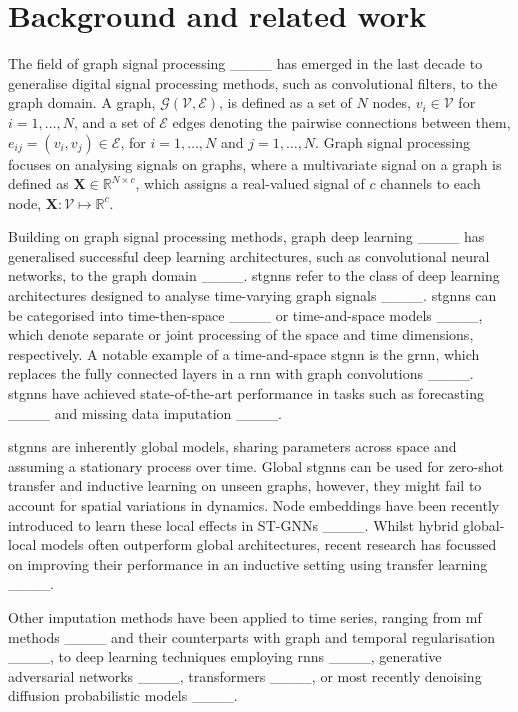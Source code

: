 \section{Background and related work}
\label{sec:background}
The field of graph signal processing ____ has emerged in the last decade to generalise digital signal processing methods, such as convolutional filters, to the graph domain. A graph, $\mathcal{G}(\mathcal{V}, \mathcal{E})$, is defined as a set of $N$ nodes, $v_i \in \mathcal{V}$ for $i = 1, \ldots, N$, and a set of $\mathcal{E}$ edges denoting the pairwise connections between them, $e_{ij} = (v_i, v_j) \in \mathcal{E}$, for $i = 1, \ldots, N$ and $j = 1, \ldots, N$. Graph signal processing focuses on analysing signals on graphs, where a multivariate signal on a graph is defined as $\mathbf{X} \in \mathbb{R}^{N\times c}$, which assigns a real-valued signal of $c$ channels to each node, $\mathbf{X}: \mathcal{V} \mapsto \mathbb{R}^c$.

Building on graph signal processing methods, graph deep learning ____ has generalised successful deep learning architectures, such as convolutional neural networks, to the graph domain ____. \Glspl{stgnn} refer to the class of deep learning architectures designed to analyse time-varying graph signals ____. \Glspl{stgnn} can be categorised into time-then-space ____ or time-and-space models ____, which denote separate or joint processing of the space and time dimensions, respectively. A notable example of a time-and-space \gls{stgnn} is the \gls{grnn}, which replaces the fully connected layers in a \gls{rnn} with graph convolutions ____. \Glspl{stgnn} have achieved state-of-the-art performance in tasks such as forecasting ____ and missing data imputation ____.

\glspl{stgnn} are inherently global models, sharing parameters across space and assuming a stationary process over time. Global \glspl{stgnn} can be used for zero-shot transfer and inductive learning on unseen graphs, however, they might fail to account for spatial variations in dynamics. Node embeddings have been recently introduced to learn these local effects in ST-GNNs ____. Whilst hybrid global-local models often outperform global architectures, recent research has focussed on improving their performance in an inductive setting using transfer learning ____.

Other imputation methods have been applied to time series, ranging from \gls{mf} methods ____ and their counterparts with graph and temporal regularisation ____, to deep learning techniques employing \glspl{rnn} ____, generative adversarial networks ____, transformers ____, or most recently denoising diffusion probabilistic models ____.